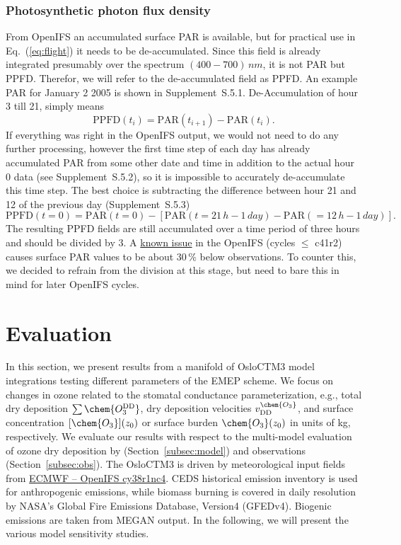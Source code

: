 \documentclass[gmd, manuscript]{copernicus}
\begin{document}
\subsubsection{Photosynthetic photon flux density}
From OpenIFS an accumulated surface PAR is available, but for practical use in Eq.~(\ref{eq:flight}) it needs to be de-accumulated. Since this field is already integrated presumably over the spectrum $(400-700)\,\unit{nm}$, it is not PAR but PPFD. Therefor, we will refer to the de-accumulated field as PPFD. An example PAR for January 2 2005 is shown in Supplement~S.5.1. De-Accumulation of hour 3 till 21, simply means
\begin{equation}
  \text{PPFD}(t_i) = \text{PAR}(t_{i+1})-\text{PAR}(t_i).
\end{equation}
If everything was right in the OpenIFS output, we would not need to do any further processing, however the first time step of each day has already accumulated PAR from some other date and time in addition to the actual hour 0 data (see Supplement~S.5.2), so it is impossible to accurately de-accumulate this time step. The best choice is subtracting the difference between hour 21 and 12 of the previous day (Supplement~S.5.3)
%
\begin{equation}
  \text{PPFD}(t=0) = \text{PAR}(t=0) - \left[\text{PAR}(t=21\,\unit{h}-1\,\unit{day})-\text{PAR}(=12\,\unit{h}-1\,\unit{day})\right].
\end{equation}
%
The resulting PPFD fields are still accumulated over a time period of three hours and should be divided by $3$. A \href{https://confluence.ecmwf.int/display/CKB/ERA-Interim\%3A+surface+photosynthetically+active+radiation+\%28surface+PAR\%29+values+are+too+low}{known issue} in the OpenIFS (cycles $\le$ c41r2) causes surface PAR values to be about $30\,\unit{\%}$ below observations. To counter this, we decided to refrain from the division at this stage, but need to bare this in mind for later OpenIFS cycles.
\section{Evaluation}
\label{sec:eval}
In this section, we present results from a manifold of OsloCTM3 model integrations testing different parameters of the EMEP scheme. We focus on changes in ozone related to the stomatal conductance parameterization, e.g., total dry deposition $\sum\chem{O_3^\text{DD}}$, dry deposition velocities $v^\chem{O_3}_\text{DD}$, and surface concentration $[\chem{O_3}](z_0)$ or surface burden $\chem{O_3}(z_0)$ in units of \unit{kg}, respectively. We evaluate our results with respect to the multi-model evaluation of ozone dry deposition by \citet{ACP:Hardacre2015} (Section~\ref{subsec:model}) and observations (Section~\ref{subsec:obs}). The OsloCTM3 is driven by meteorological input fields from \href{https://www.ecmwf.int/en/forecasts/documentation-and-support/evolution-ifs/cycle-38r1-summary-changes}{ECMWF -- OpenIFS cy38r1nc4}. CEDS historical emission inventory is used for anthropogenic emissions, while biomass burning is covered in daily resolution by NASA's Global Fire Emissions Database, Version4 (GFEDv4). Biogenic emissions are taken from MEGAN output. In the following, we will present the various model sensitivity studies.
\end{document}
